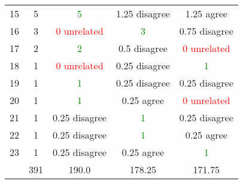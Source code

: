 \begin{center}
\begin{tabular}{ r | c || c c c }
  15                   & 5      & \textcolor{green}{5}         & 1.25 disagree                & 1.25 agree                   \\
  16                   & 3      & \textcolor{red}{0 unrelated} & \textcolor{green}{3}         & 0.75 disagree                \\
  17                   & 2      & \textcolor{green}{2}         & 0.5 disagree                 & \textcolor{red}{0 unrelated} \\
  18                   & 1      & \textcolor{red}{0 unrelated} & 0.25 disagree                & \textcolor{green}{1}         \\
  19                   & 1      & \textcolor{green}{1}         & 0.25 disagree                & 0.25 disagree                \\
  20                   & 1      & \textcolor{green}{1}         & 0.25 agree                   & \textcolor{red}{0 unrelated} \\
  21                   & 1      & 0.25 disagree                & \textcolor{green}{1}         & 0.25 disagree                \\
  22                   & 1      & 0.25 disagree                & \textcolor{green}{1}         & 0.25 agree                   \\
  23                   & 1      & 0.25 disagree                & 0.25 agree                   & \textcolor{green}{1}         \\ \hline
                       & 391    & 190.0                        & 178.25                       & 171.75                       \\
 \end{tabular}
\end{center}
